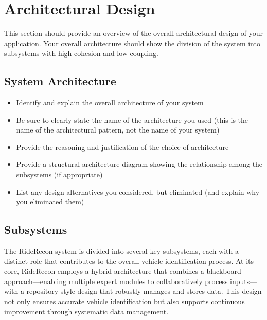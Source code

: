 \documentclass[]{article}
\begin{document}
\section{Architectural Design}
\label{sec:architectural_design}
This section should provide an overview of the overall architectural design of your application. Your overall architecture should show the division of the system into subsystems with high cohesion and low coupling.

\subsection{System Architecture}
\label{sub:system_architecture}
\begin{itemize}
	\item Identify and explain the overall architecture of your system
	\item Be sure to clearly state the name of the architecture you used (this is the name of the architectural pattern, not the name of your system)
	\item Provide the reasoning and justification of the choice of architecture
	\item Provide a structural architecture diagram showing the relationship among the subsystems (if appropriate)
	\item List any design alternatives you considered, but eliminated (and explain why you eliminated them)
\end{itemize}

\subsection{Subsystems}
\label{sub:subsystems}
The RideRecon system is divided into several key subsystems, each with a distinct role that contributes to the overall vehicle identification process. At its core, RideRecon employs a hybrid architecture that combines a blackboard approach—enabling multiple expert modules to collaboratively process inputs—with a repository-style design that robustly manages and stores data. This design not only ensures accurate vehicle identification but also supports continuous improvement through systematic data management.\\
\end{document}
